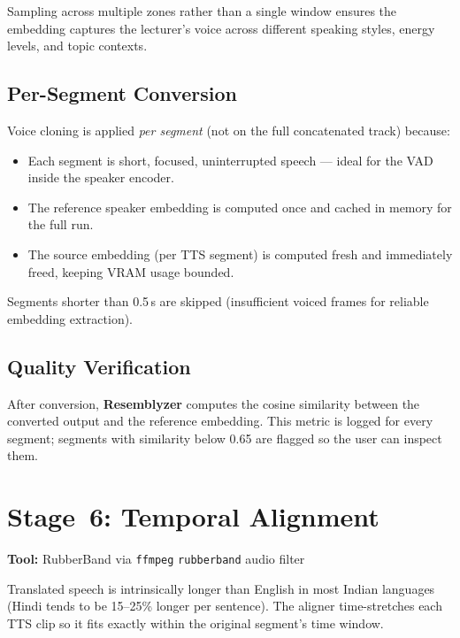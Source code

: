 \documentclass[12pt,a4paper]{article}
\begin{document}
Sampling across multiple zones rather than a single window ensures the
embedding captures the lecturer's voice across different speaking styles,
energy levels, and topic contexts.

\subsection{Per-Segment Conversion}

Voice cloning is applied \emph{per segment} (not on the full concatenated
track) because:
\begin{itemize}
  \item Each segment is short, focused, uninterrupted speech — ideal for
        the VAD inside the speaker encoder.
  \item The reference speaker embedding is computed once and cached in
        memory for the full run.
  \item The source embedding (per TTS segment) is computed fresh and
        immediately freed, keeping VRAM usage bounded.
\end{itemize}

Segments shorter than 0.5\,s are skipped (insufficient voiced frames for
reliable embedding extraction).

\subsection{Quality Verification}

After conversion, \textbf{Resemblyzer} computes the cosine similarity
between the converted output and the reference embedding.  This metric
is logged for every segment; segments with similarity below 0.65 are
flagged so the user can inspect them.

\section{Stage~6: Temporal Alignment}

\textbf{Tool:} RubberBand via \texttt{ffmpeg} \texttt{rubberband} audio filter

Translated speech is intrinsically longer than English in most Indian languages
(Hindi tends to be 15--25\% longer per sentence).  The aligner time-stretches
each TTS clip so it fits exactly within the original segment's time window.
\end{document}
